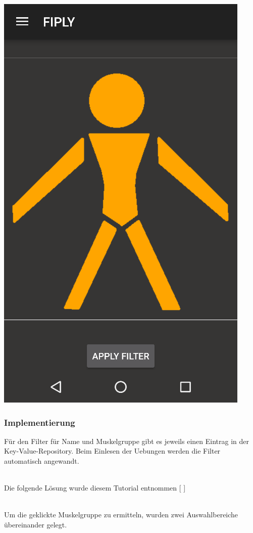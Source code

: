 \documentclass[FIPLY_base.tex]{subfiles}
\begin{document}
\includegraphics[scale=0.4]{img/Uebungskatalog_filter}
\newpage

\subsubsection{Implementierung}
Für den Filter für Name und Muskelgruppe gibt es jeweils einen Eintrag in der Key-Value-Repository.
Beim Einlesen der Uebungen werden die Filter automatisch angewandt.

\ \\
Die folgende Lösung wurde diesem Tutorial entnommen  [ \cite{ueClickableAreas}]

\ \\
Um die geklickte Muskelgruppe zu ermitteln, wurden zwei Auswahlbereiche übereinander gelegt.
\end{document}
